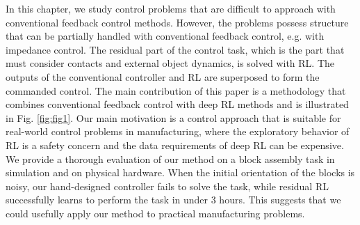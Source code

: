 In this chapter, we study control problems that are difficult to approach with conventional feedback control methods. 
However, the problems possess structure that can be partially handled with conventional feedback control, e.g. with impedance control.
The residual part of the control task, which is the part that must consider contacts and external object dynamics, is solved with RL. The outputs of the conventional controller and RL are superposed to form the commanded control.
The main contribution of this paper is a methodology that combines conventional feedback control with deep RL methods and is illustrated in Fig. \ref{fig:fig1}.
Our main motivation is a control approach that is suitable for real-world control problems in manufacturing, where the exploratory behavior of RL is a safety concern and the data requirements of deep RL can be expensive.
We provide a thorough evaluation of our method on a block assembly task in simulation and on physical hardware. When the initial orientation of the blocks is noisy, our hand-designed controller fails to solve the task, while residual RL successfully learns to perform the task in under 3 hours. This suggests that we could usefully apply our method to practical manufacturing problems.